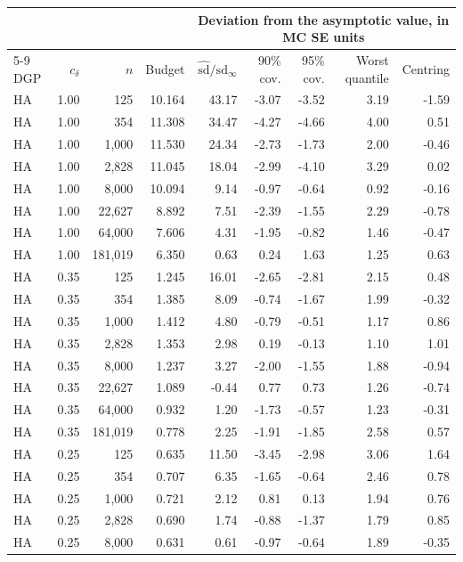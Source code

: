 \begin{tabular}{lrrrrrrrr}
\toprule
 & & & & \multicolumn{5}{c}{Deviation from the asymptotic value, in MC SE units} \\
\cmidrule(lr){5-9}
DGP & $c_\delta$ & $n$ & Budget & $\hat{\mathrm{sd}}/\mathrm{sd}_\infty$ & 90\% cov. & 95\% cov. & Worst quantile & Centring \\
\midrule
HA & 1.00 & 125 & 10.164 & 43.17 & -3.07 & -3.52 & 3.19 & -1.59 \\
HA & 1.00 & 354 & 11.308 & 34.47 & -4.27 & -4.66 & 4.00 & 0.51 \\
HA & 1.00 & 1,000 & 11.530 & 24.34 & -2.73 & -1.73 & 2.00 & -0.46 \\
HA & 1.00 & 2,828 & 11.045 & 18.04 & -2.99 & -4.10 & 3.29 & 0.02 \\
HA & 1.00 & 8,000 & 10.094 & 9.14 & -0.97 & -0.64 & 0.92 & -0.16 \\
HA & 1.00 & 22,627 & 8.892 & 7.51 & -2.39 & -1.55 & 2.29 & -0.78 \\
HA & 1.00 & 64,000 & 7.606 & 4.31 & -1.95 & -0.82 & 1.46 & -0.47 \\
HA & 1.00 & 181,019 & 6.350 & 0.63 & 0.24 & 1.63 & 1.25 & 0.63 \\
HA & 0.35 & 125 & 1.245 & 16.01 & -2.65 & -2.81 & 2.15 & 0.48 \\
HA & 0.35 & 354 & 1.385 & 8.09 & -0.74 & -1.67 & 1.99 & -0.32 \\
HA & 0.35 & 1,000 & 1.412 & 4.80 & -0.79 & -0.51 & 1.17 & 0.86 \\
HA & 0.35 & 2,828 & 1.353 & 2.98 & 0.19 & -0.13 & 1.10 & 1.01 \\
HA & 0.35 & 8,000 & 1.237 & 3.27 & -2.00 & -1.55 & 1.88 & -0.94 \\
HA & 0.35 & 22,627 & 1.089 & -0.44 & 0.77 & 0.73 & 1.26 & -0.74 \\
HA & 0.35 & 64,000 & 0.932 & 1.20 & -1.73 & -0.57 & 1.23 & -0.31 \\
HA & 0.35 & 181,019 & 0.778 & 2.25 & -1.91 & -1.85 & 2.58 & 0.57 \\
HA & 0.25 & 125 & 0.635 & 11.50 & -3.45 & -2.98 & 3.06 & 1.64 \\
HA & 0.25 & 354 & 0.707 & 6.35 & -1.65 & -0.64 & 2.46 & 0.78 \\
HA & 0.25 & 1,000 & 0.721 & 2.12 & 0.81 & 0.13 & 1.94 & 0.76 \\
HA & 0.25 & 2,828 & 0.690 & 1.74 & -0.88 & -1.37 & 1.79 & 0.85 \\
HA & 0.25 & 8,000 & 0.631 & 0.61 & -0.97 & -0.64 & 1.89 & -0.35 \\

\end{tabular}
